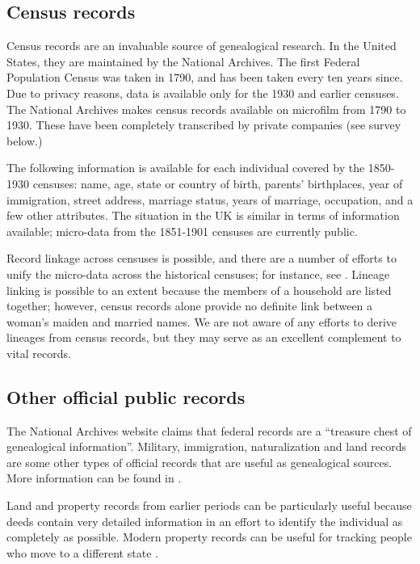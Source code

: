 \documentclass{article}
\begin{document}
\subsection{Census records}

Census records are an invaluable source of genealogical research. In the United States, they are maintained by the National Archives. The first Federal Population Census was taken in 1790, and has been taken every ten years since. Due to privacy reasons, data is available only for the 1930 and earlier censuses. The National Archives makes census records available on microfilm from 1790 to 1930. These have been completely transcribed by private companies (see survey below.)

The following information is available for each individual covered by the 1850-1930 censuses: name, age, state or country of birth, parents' birthplaces, year of immigration, street address, marriage status, years of marriage, occupation, and a few other attributes. The situation in the UK is similar in terms of information available; micro-data from the 1851-1901 censuses are currently public.

Record linkage across censuses is possible, and there are a number of efforts to unify the micro-data across the historical censuses; for instance, see \cite{ipums-usa}. Lineage linking is possible to an extent because the members of a household are listed together; however, census records alone provide no definite link between a woman's maiden and married names. We are not aware of any efforts to derive lineages from census records, but they may serve as an excellent complement to vital records.


\subsection{Other official public records}

The National Archives website claims that federal records are a ``treasure chest of genealogical information''\cite{nara-faq}. Military, immigration, naturalization and land records are some other types of official records that are useful as genealogical sources. 
More information can be found in \cite{nara-faq}. 

Land and property records from earlier periods can be particularly useful because deeds contain very detailed information in an effort to identify the individual as completely as possible. Modern property records can be useful for tracking people who move to a different state \cite{messing}.
\end{document}
